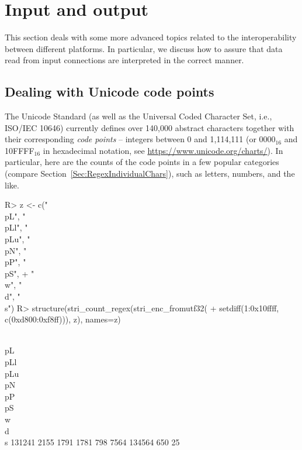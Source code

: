 \documentclass[nojss]{jss}\usepackage[]{graphicx}\usepackage[]{color}
\begin{document}





\section{Input and output}\label{Sec:io}

This section deals with some more advanced topics related to the
interoperability
between different platforms. In particular, we discuss
how to assure that data read from input connections are interpreted
in the correct manner.



\subsection{Dealing with Unicode code points}\label{Sec:codepoints}

The Unicode Standard (as well as the
Universal Coded Character Set, i.e., ISO/IEC 10646)
currently defines over 140{,}000 abstract characters together with
their corresponding \textit{code points} -- integers
between 0 and 1{,}114{,}111 (or 0000${}_{16}$ and 10FFFF${}_{16}$
in hexadecimal notation, see \url{https://www.unicode.org/charts/}).
In particular, here are the counts of the code points in
a few popular categories (compare Section~\ref{Sec:RegexIndividualChars}),
such as letters, numbers, and the like.

\begin{Schunk}
\begin{Sinput}
R> z <- c("\\p{L}", "\\p{Ll}", "\\p{Lu}", "\\p{N}", "\\p{P}", "\\p{S}",
+    "\\w", "\\d", "\\s")
R> structure(stri_count_regex(stri_enc_fromutf32(
+    setdiff(1:0x10ffff, c(0xd800:0xf8ff))), z), names=z)
\end{Sinput}
\begin{Soutput}
 \\p{L} \\p{Ll} \\p{Lu}  \\p{N}  \\p{P}  \\p{S}     \\w     \\d     \\s
 131241    2155    1791    1781     798    7564  134564     650      25
\end{Soutput}
\end{Schunk}
\end{document}
